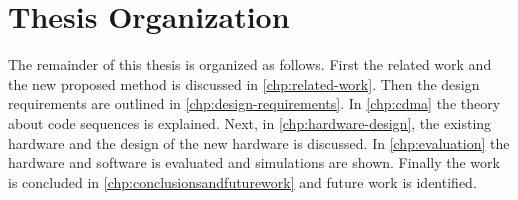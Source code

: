 
\section{Thesis Organization}

The remainder of this thesis is organized as follows.
First the related work and the new proposed method is discussed in \autoref{chp:related-work}.
Then the design requirements are outlined in \autoref{chp:design-requirements}.
In \autoref{chp:cdma} the theory about code sequences is explained.
Next, in \autoref{chp:hardware-design}, the existing hardware and the design of the new hardware is discussed.
In \autoref{chp:evaluation} the hardware and software is evaluated and simulations are shown.
Finally the work is concluded in \autoref{chp:conclusionsandfuturework} and future work is identified.